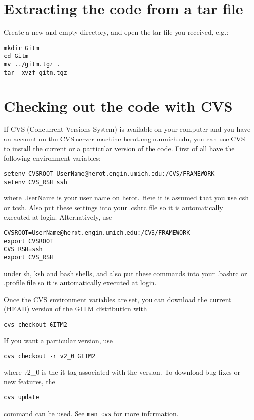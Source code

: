\section{Extracting the code from a tar file}

Create a new and empty directory, and open the tar file you received,
e.g.:
\begin{verbatim}
mkdir Gitm 
cd Gitm 
mv ../gitm.tgz . 
tar -xvzf gitm.tgz 
\end{verbatim}

\section{Checking out the code with CVS}
\label{cvs.sec}

If CVS (Concurrent Versions System) is available on your computer and
you have an account on the CVS server machine herot.engin.umich.edu,
you can use CVS to install the current or a particular version of the
code. First of all have the following environment variables:
\begin{verbatim}
setenv CVSROOT UserName@herot.engin.umich.edu:/CVS/FRAMEWORK
setenv CVS_RSH ssh
\end{verbatim}
where UserName is your user name on herot. Here it is assumed that you
use csh or tcsh. Also put these settings into your .cshrc file so it
is automatically executed at login. Alternatively, use
\begin{verbatim}
CVSROOT=UserName@herot.engin.umich.edu:/CVS/FRAMEWORK 
export CVSROOT 
CVS_RSH=ssh 
export CVS_RSH
\end{verbatim}
under sh, ksh and bash shells, and also put these commands into your
.bashrc or .profile file so it is automatically executed at login.

Once the CVS environment variables are set, you can download the
current (HEAD) version of the GITM distribution with
\begin{verbatim}
cvs checkout GITM2
\end{verbatim}

If you want a particular version, use
\begin{verbatim}
cvs checkout -r v2_0 GITM2
\end{verbatim}
where v2\_0 is the it tag associated with the version. To download bug
fixes or new features, the
\begin{verbatim}
cvs update 
\end{verbatim}
command can be used. See {\tt man cvs} for more information.

